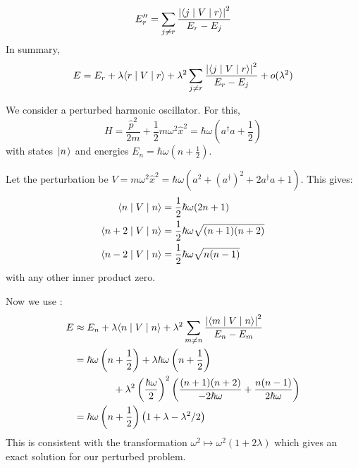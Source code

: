 \documentclass[../Main.tex]{subfiles}
\begin{document}
\begin{equation*}
    E_r'' = \sum_{j\neq r} \frac{\left|\langle j\mid V\mid r\rangle\right|^2}{E_r - E_j}
\end{equation*}
In summary,
\begin{equation}
    E = E_r + \lambda \langle r\mid V\mid r\rangle + \lambda^2 \sum_{j \neq r} \frac{\left|\langle j\mid V\mid r\rangle\right|^2}{E_r - E_j} + o(\lambda^2)
    \label{eqnNonDegenPerturb}
\end{equation}
\begin{example}
    \label{exHarmOscPerturb}
    We consider a perturbed harmonic oscillator. For this,
    \begin{equation*}
        H = \frac{\hat{p}^2}{2m} + \frac12 m\omega^2 \hat{x}^2 = \hbar \omega \left(a^\dagger a + \frac12\right)
    \end{equation*}
    with states $\left.\left|n\right.\right\rangle$ and energies $E_n = \hbar \omega (n + \frac12)$.

    Let the perturbation be $V = m\omega^2 \hat{x}^2 = \hbar\omega(a^2 + (a^\dagger)^2 + 2a^\dagger a + 1)$. This gives:
    \begin{align*}
        \langle n\mid V\mid n\rangle &= \frac12 \hbar \omega (2n + 1) \\
        \langle n+2\mid V\mid n\rangle &= \frac12 \hbar \omega \sqrt{(n+1)(n+2)} \\
        \langle n-2\mid V\mid n\rangle &= \frac12 \hbar \omega \sqrt{n(n-1)}
    \end{align*}
    with any other inner product zero.
    
    Now we use :
    \begin{align*}
        E &\approx E_n + \lambda \langle n\mid V\mid n\rangle + \lambda^2 \sum_{m \neq n} \frac{\left|\langle m\mid V\mid n\rangle\right|^2}{E_n - E_m} \\
        &= \hbar \omega \left(n + \frac12\right) + \lambda \hbar \omega \left(n + \frac12\right) \\
        &\qquad\qquad+ \lambda^2 \left(\frac{\hbar\omega}{2}\right)^2 \left(\frac{(n+1)(n+2)}{-2\hbar\omega} + \frac{n(n-1)}{2\hbar\omega}\right) \\
        &= \hbar \omega \left(n + \frac12\right) \left(1 + \lambda - \lambda^2 / 2\right)
    \end{align*}
    This is consistent with the transformation $\omega^2 \mapsto \omega^2 (1 + 2\lambda)$ which gives an exact solution for our perturbed problem.
\end{example}
\end{document}
